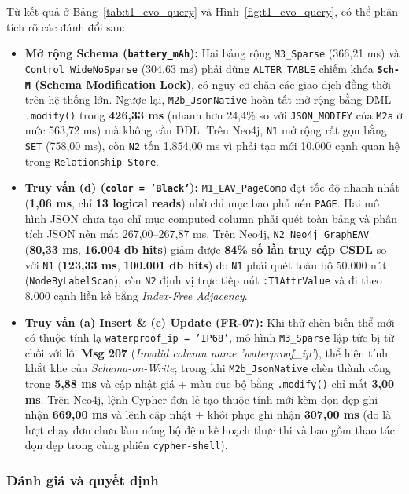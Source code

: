 Từ kết quả ở Bảng~\ref{tab:t1_evo_query} và Hình~\ref{fig:t1_evo_query}, có thể phân tích rõ các đánh đổi sau:
\begin{itemize}
  \item \textbf{Mở rộng Schema (\texttt{battery\_mAh}):} Hai bảng rộng \texttt{M3\_Sparse} (366,21 ms) và \texttt{Control\_WideNoSparse} (304,63 ms) phải dùng \texttt{ALTER TABLE} chiếm khóa \textbf{\texttt{Sch-M} (Schema Modification Lock)}, có nguy cơ chặn các giao dịch đồng thời trên hệ thống lớn. Ngược lại, \texttt{M2b\_JsonNative} hoàn tất mở rộng bằng DML \texttt{.modify()} trong \textbf{426,33 ms} (nhanh hơn 24,4\% so với \texttt{JSON\_MODIFY} của \texttt{M2a} ở mức 563,72 ms) mà không cần DDL. Trên Neo4j, \texttt{N1} mở rộng rất gọn bằng \texttt{SET} (758,00 ms), còn \texttt{N2} tốn 1.854,00 ms vì phải tạo mới 10.000 cạnh quan hệ trong \texttt{Relationship Store}.
  \item \textbf{Truy vấn (d) (\texttt{color = 'Black'}):} \texttt{M1\_EAV\_PageComp} đạt tốc độ nhanh nhất (\textbf{1,06 ms}, chỉ \textbf{13 logical reads}) nhờ chỉ mục bao phủ nén \texttt{PAGE}. Hai mô hình JSON chưa tạo chỉ mục computed column phải quét toàn bảng và phân tích JSON nên mất 267,00--267,87 ms. Trên Neo4j, \texttt{N2\_Neo4j\_GraphEAV} (\textbf{80,33 ms}, \textbf{16.004 db hits}) giảm được \textbf{84\% số lần truy cập CSDL} so với \texttt{N1} (\textbf{123,33 ms}, \textbf{100.001 db hits}) do \texttt{N1} phải quét toàn bộ 50.000 nút (\texttt{NodeByLabelScan}), còn \texttt{N2} định vị trực tiếp nút \texttt{:T1AttrValue} và đi theo 8.000 cạnh liền kề bằng \textit{Index-Free Adjacency}.
  \item \textbf{Truy vấn (a) Insert \& (c) Update (FR-07):} Khi thử chèn biến thể mới có thuộc tính lạ \texttt{waterproof\_ip = 'IP68'}, mô hình \texttt{M3\_Sparse} lập tức bị từ chối với lỗi \textbf{Msg 207} (\textit{Invalid column name 'waterproof\_ip'}), thể hiện tính khắt khe của \textit{Schema-on-Write}; trong khi \texttt{M2b\_JsonNative} chèn thành công trong \textbf{5,88 ms} và cập nhật giá + màu cục bộ bằng \texttt{.modify()} chỉ mất \textbf{3,00 ms}. Trên Neo4j, lệnh Cypher đơn lẻ tạo thuộc tính mới kèm dọn dẹp ghi nhận \textbf{669,00 ms} và lệnh cập nhật + khôi phục ghi nhận \textbf{307,00 ms} (do là lượt chạy đơn chưa làm nóng bộ đệm kế hoạch thực thi và bao gồm thao tác dọn dẹp trong cùng phiên \texttt{cypher-shell}).
\end{itemize}

\subsubsection{Đánh giá và quyết định}

